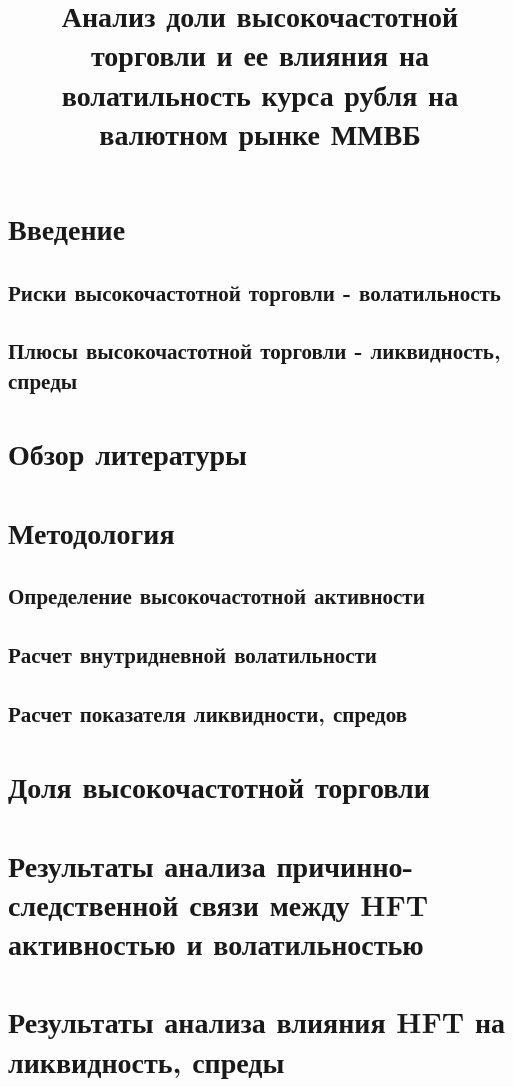 \documentclass{article}
\begin{document}
\title{Анализ доли высокочастотной торговли и ее влияния на волатильность курса рубля на валютном рынке ММВБ}
\author{}
\date{}
\maketitle
\section{Введение}
	\subsection{Риски высокочастотной торговли - волатильность}
	\subsection{Плюсы высокочастотной торговли - ликвидность, спреды}
\section{Обзор литературы}
\section{Методология}
	\subsection{Определение высокочастотной активности}
	\subsection{Расчет внутридневной волатильности}
	\subsection{Расчет показателя ликвидности, спредов}
\section{Доля высокочастотной торговли}
\section{Результаты анализа причинно-следственной связи между HFT активностью и волатильностью}
\section{Результаты анализа влияния HFT на ликвидность, спреды}
\end{document}
